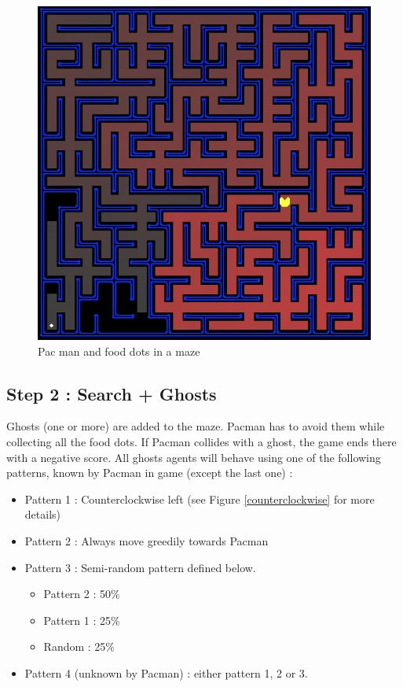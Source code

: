 \documentclass[12pt,a4paper,BCOR12mm, headexclude, footexclude, twoside, openright]{scrartcl}
\numberwithin{equation}{section} %
\numberwithin{figure}{section} %
\numberwithin{table}{section} %
\begin{document}
\begin{figure}
	\label{fullmaze}
	\begin{center}
	
	\includegraphics[scale=0.5]{pacmazefull.png}
    \caption{Pac man and food dots in a maze}
    \end{center}
\end{figure}





\subsection{Step 2 : Search + Ghosts}

Ghosts (one or more) are added to the maze. Pacman has to avoid them while collecting all the food dots. If Pacman collides with a ghost, the game ends there with a negative score. All ghosts agents will behave using one of the following patterns, known by Pacman in game (except the last one) :

\begin{itemize}
	\item Pattern 1 : Counterclockwise left (see Figure \ref{counterclockwise} for more details) 
    \item Pattern 2 : Always move greedily towards Pacman
    \item Pattern 3 : Semi-random pattern defined below.
    \begin{itemize}
    	\item Pattern 2 : 50\% 
        \item Pattern 1 : 25\%
        \item Random : 25\%
    \end{itemize}
    \item Pattern 4 (unknown by Pacman) : either pattern 1, 2 or 3.
\end{itemize}
\end{document}
